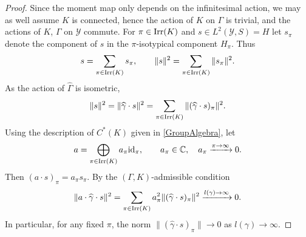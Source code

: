 \documentclass[11pt,reqno]{amsart}
\theoremstyle{definition}
\theoremstyle{remark}
\newcommand{\tn}[1]{\textnormal{#1}}
\def\Y{\ensuremath{\mathcal{Y}}}
\def\bC{\ensuremath{\mathbb{C}}}
\def\id{\ensuremath{\textnormal{id}}}
\def\Irr{\ensuremath{\tn{Irr}}}
\def\hGamma{\ensuremath{\widehat{\Gamma}}}
\def\hgamma{\ensuremath{\widehat{\gamma}}}
\begin{document}
\begin{proof}
Since the moment map only depends on the infinitesimal action, we may as well assume $K$ is connected, hence the action of $K$ on $\Gamma$ is trivial, and the actions of $K$, $\Gamma$ on $\Y$ commute.  For $\pi \in \Irr(K)$ and $s \in L^2(\Y,S)=H$ let $s_\pi$ denote the component of $s$ in the $\pi$-isotypical component $H_\pi$.  Thus
\[ s=\sum_{\pi \in \Irr(K)} s_\pi, \qquad \|s\|^2=\sum_{\pi \in \Irr(K)}\|s_\pi\|^2.\]
As the action of $\hGamma$ is isometric,
\begin{equation} 
\label{eqn:ConsMass}
\|s\|^2=\|\hgamma \cdot s\|^2=\sum_{\pi \in \Irr(K)} \|(\hgamma \cdot s)_{\pi}\|^2.
\end{equation}
Using the description of $C^\ast(K)$ given in \eqref{GroupAlgebra}, let
\[ a=\bigoplus_{\pi \in \Irr(K)} a_\pi \id_\pi, \qquad a_\pi \in \bC, \quad a_\pi \xrightarrow{\pi \rightarrow \infty} 0.\]
Then $(a\cdot s)_\pi=a_\pi s_\pi$.  By the $(\Gamma,K)$-admissible condition
\[ \|a \cdot \hgamma \cdot s\|^2=\sum_{\pi \in \Irr(K)}a_\pi^2\|(\hgamma \cdot s)_\pi\|^2 \xrightarrow{l(\gamma)\rightarrow \infty} 0.\]
In particular, for any fixed $\pi$, the norm $\|(\hgamma \cdot s)_{\pi}\| \rightarrow 0$ as $l(\gamma) \rightarrow \infty$.  


\end{proof}
\end{document}
